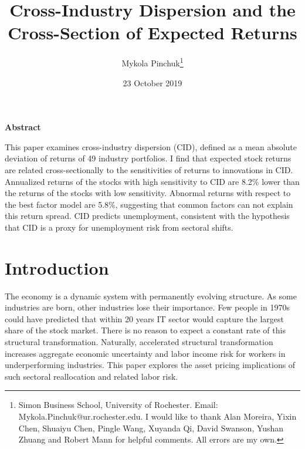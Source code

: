 \documentclass[12pt]{article}
\begin{document}
\onehalfspacing      %
\renewcommand{\footnote}{\endnote}  %

\author{\large{Mykola Pinchuk}\thanks{\rm Simon Business School, University of Rochester. Email: Mykola.Pinchuk@ur.rochester.edu. \newline I would like to thank Alan Moreira, Yixin Chen, Shuaiyu Chen, Pingle Wang, Xuyanda Qi, David Swanson, Yushan Zhuang and Robert Mann for helpful comments. All errors are my own.}}

\title{\bf Cross-Industry Dispersion and the Cross-Section of Expected Returns}

\date{23 October 2019}  

\maketitle
\thispagestyle{empty}

\bigskip

\normalsize
\vspace{1cm}

\centerline{\bf Abstract}

\vspace{0.5cm}

\begin{onehalfspace}  %
  \noindent This paper examines cross-industry dispersion (CID), defined as a mean absolute deviation of returns of 49 industry portfolios. I find that expected stock returns are related cross-sectionally to the sensitivities of returns to innovations in CID. Annualized returns of the stocks with high sensitivity to CID are 8.2\% lower than the returns of the stocks with low sensitivity. Abnormal returns with respect to the best factor model are 5.8\%, suggesting that common factors can not explain this return spread. CID predicts unemployment, consistent with the hypothesis that CID is a proxy for unemployment risk from sectoral shifts. 
\end{onehalfspace}
\medskip


\clearpage
{}


\section{Introduction} \label{sec:Model}
The economy is a dynamic system with permanently evolving structure. As some industries are born, other industries lose their importance. Few people in 1970s could have predicted that within 20 years IT sector would capture the largest share of the stock market. There is no reason to expect a constant rate of this structural transformation. Naturally, accelerated structural transformation increases aggregate economic uncertainty and labor income risk for workers in underperforming industries. This paper explores the asset pricing implications of such sectoral reallocation and related labor risk.
\end{document}
